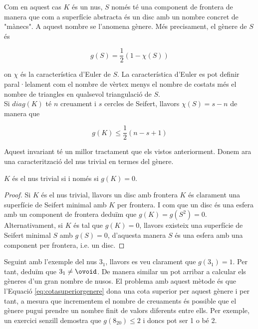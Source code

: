 Com en aquest cas $K$ és un nus, $S$ només té una component de frontera de manera que com a superfície abstracta és un disc amb un nombre concret de "mànecs". A aquest nombre se l'anomena gènere. Més precisament, el gènere de $S$ és

\begin{equation}\label{eq:generedunasuperficie}
	g(S)=\frac{1}{2}(1-\mathcal{\chi}(S))
\end{equation}

on $\mathcal{\chi}$ és la característica d'Euler de $S$. La característica d'Euler es pot definir paral·lelament com el nombre de vèrtex menys el nombre de costats més el nombre de triangles en qualsevol triangulació de $S$.\\

Si $diag(K)$ té $n$ creuament i $s$ cercles de Seifert, llavors $\mathcal{\chi}(S)=s-n$ de manera que

\begin{equation}\label{eq:cotasuperiorgenere}
	g(K)\leq \frac{1}{2}(n-s+1)
\end{equation}

Aquest invariant té un millor tractament que els vistos anteriorment. Donem ara una caracterització del nus trivial en termes del gènere.

\begin{proposition}
	$K$ és el nus trivial si i només si $g(K)=0$.
\end{proposition}

\begin{proof}
	Si $K$ és el nus trivial, llavors un disc amb frontera $K$ és clarament una superfície de Seifert minimal amb $K$ per frontera. I com que un disc és una esfera amb un component de frontera deduïm que $g(K)=g(S^2)=0$. Alternativament, si $K$ és tal que $g(K)=0$, llavors existeix una superfície de Seifert minimal $S$ amb $g(S)=0$, d'aquesta manera $S$ és una esfera amb una component per frontera, i.e. un disc.
\end{proof}

Seguint amb l'exemple del nus $3_1$, llavors es veu clarament que $g(3_1)=1$. Per tant, deduïm que $3_1\neq\ovoid$. De manera similar un pot arribar a calcular els gèneres d'un gran nombre de nusos. El problema amb aquest mètode és que l'Equació \ref{eq:cotasuperiorgenere} dona una cota superior per aquest gènere i per tant, a mesura que incrementem el nombre de creuaments és possible que el gènere pugui prendre un nombre finit de valors diferents entre ells. Per exemple, un exercici senzill demostra que $g(8_{20})\leq2$ i doncs pot ser 1 o bé 2.

